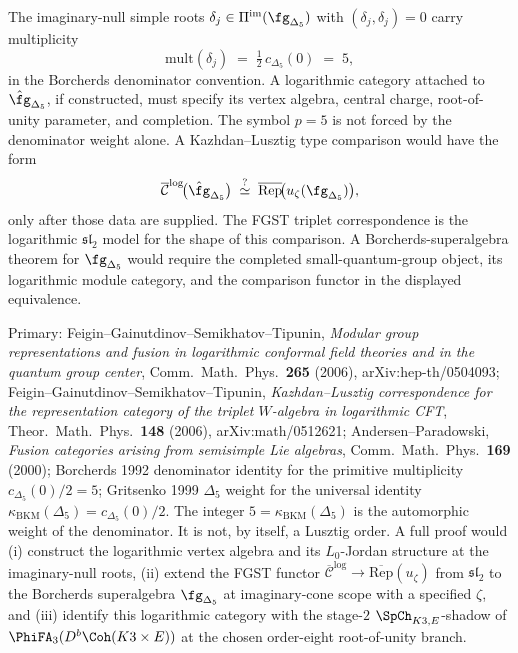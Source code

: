 \begin{conjecture}
\label{conj:k3y-logarithmic-W-p5-programme}
\ClaimStatusConjectured
The imaginary-null simple roots
$\delta_j \in \Pi^{\mathrm{im}}(\fg_{\Delta_5})$ with
$(\delta_j, \delta_j) = 0$ carry multiplicity
\[
 \mathrm{mult}(\delta_j) \;=\; \tfrac{1}{2}\, c_{\Delta_5}(0)
 \;=\; 5,
\]
in the Borcherds denominator convention. A logarithmic category
attached to \(\hat\fg_{\Delta_5}\), if constructed, must specify its
vertex algebra, central charge, root-of-unity parameter, and completion.
The symbol \(p=5\) is not forced by the denominator weight alone. A
Kazhdan--Lusztig type comparison would have the form
\[
 \overline{\mathcal C}^{\log}\!\bigl(\hat\fg_{\Delta_5}\bigr)
 \;\stackrel{?}{\simeq}\;
 \overline{\mathrm{Rep}}\!\bigl(u_\zeta(\fg_{\Delta_5})\bigr),
\]
only after those data are supplied. The FGST triplet correspondence is
the logarithmic \(\mathfrak{sl}_2\) model for the shape of this
comparison. A Borcherds-superalgebra theorem for
\(\fg_{\Delta_5}\) would require the completed small-quantum-group
object, its logarithmic module category, and the comparison functor in
the displayed equivalence.
\end{conjecture}

Primary: Feigin--Gainutdinov--Semikhatov--Tipunin,
\emph{Modular group representations and fusion in logarithmic
conformal field theories and in the quantum group center}, Comm.\
Math.\ Phys.\ \textbf{265} (2006), arXiv:hep-th/0504093;
Feigin--Gainutdinov--Semikhatov--Tipunin,
\emph{Kazhdan--Lusztig correspondence for the representation
category of the triplet $W$-algebra in logarithmic CFT},
Theor.\ Math.\ Phys.\ \textbf{148} (2006), arXiv:math/0512621;
Andersen--Paradowski,
\emph{Fusion categories arising from semisimple Lie algebras},
Comm.\ Math.\ Phys.\ \textbf{169} (2000); Borcherds 1992 denominator
identity for the primitive multiplicity $c_{\Delta_5}(0)/2 = 5$; Gritsenko
1999 $\Delta_5$ weight for the universal identity
$\kappa_{\mathrm{BKM}}(\Delta_5) = c_{\Delta_5}(0)/2$. The
integer \(5=\kappa_{\mathrm{BKM}}(\Delta_5)\) is the automorphic weight
of the denominator. It is not, by itself, a Lusztig order. A full proof
would (i) construct the logarithmic vertex algebra and its \(L_0\)-Jordan
structure at the imaginary-null roots, (ii) extend the FGST functor
$\overline{\mathcal C}^{\log} \to \overline{\mathrm{Rep}}(u_\zeta)$
from $\mathfrak{sl}_2$ to the Borcherds superalgebra
$\fg_{\Delta_5}$ at imaginary-cone scope with a specified \(\zeta\), and
(iii) identify this logarithmic category with the stage-$2$
$\SpCh_{K3,E}$-shadow of $\PhiFA_3(D^b\Coh(K3\times E))$ at the
chosen order-eight root-of-unity branch.

